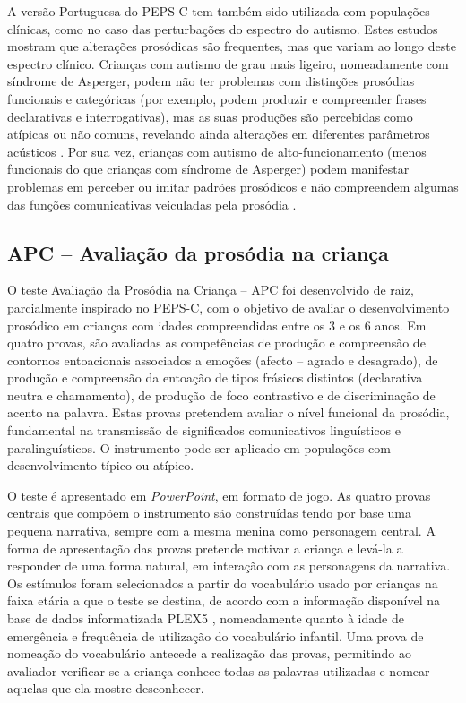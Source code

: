 \documentclass[output=paper,colorlinks,citecolor=brown,booklanguage=portuguese]{langscibook}
\begin{document}
A versão Portuguesa do PEPS-C tem também sido utilizada com populações clínicas, como no caso das perturbações do espectro do autismo. Estes estudos mostram que alterações prosódicas são frequentes, mas que variam ao longo deste espectro clínico. Crianças com autismo de grau mais ligeiro, nomeadamente com síndrome de Asperger, podem não ter problemas com distinções prosódias funcionais e categóricas (por exemplo, podem produzir e compreender frases declarativas e interrogativas), mas as suas produções são percebidas como atípicas ou não comuns, revelando ainda alterações em diferentes parâmetros acústicos \citep{Filipe2014}. Por sua vez, crianças com autismo de alto-funcionamento (menos funcionais do que crianças com síndrome de Asperger) podem manifestar problemas em perceber ou imitar padrões prosódicos e não compreendem algumas das funções comunicativas veiculadas pela prosódia \citep{Filipe2016}.

\subsection{APC -- Avaliação da prosódia na criança}
O teste Avaliação da Prosódia na Criança -- APC \citep{Vidal2018} foi desenvolvido de raiz, parcialmente inspirado no PEPS-C, com o objetivo de avaliar o desenvolvimento prosódico em crianças com idades compreendidas entre os 3 e os 6 anos. Em quatro provas, são avaliadas as competências de produção e compreensão de contornos entoacionais associados a emoções (afecto -- agrado e desagrado), de produção e compreensão da entoação de tipos frásicos distintos (declarativa neutra e chamamento), de produção de foco contrastivo e de discriminação de acento na palavra. Estas provas pretendem avaliar o nível funcional da prosódia, fundamental na transmissão de significados comunicativos linguísticos e paralinguísticos. O instrumento pode ser aplicado em populações com desenvolvimento típico ou atípico. 

O teste é apresentado em \emph{PowerPoint}, em formato de jogo. As quatro provas centrais que compõem o instrumento são construídas tendo por base uma pequena narrativa, sempre com a mesma menina como personagem central. A forma de apresentação das provas pretende motivar a criança e levá-la a responder de uma forma natural, em interação com as personagens da narrativa. Os estímulos foram selecionados a partir do vocabulário usado por crianças na faixa etária a que o teste se destina, de acordo com a informação disponível na base de dados informatizada PLEX5 \citep{Frota2012b}, nomeadamente quanto à idade de emergência e frequência de utilização do vocabulário infantil. Uma prova de nomeação do vocabulário antecede a realização das provas, permitindo ao avaliador verificar se a criança conhece todas as palavras utilizadas e nomear aquelas que ela mostre desco\-nhecer. 
\end{document}
